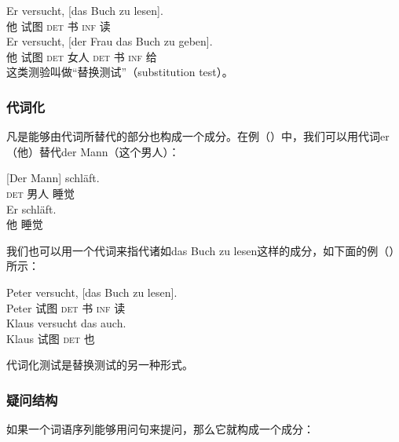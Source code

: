 \eal
\ex\label{ex-das-buch-zu-lesen} 
\gll Er versucht, [das Buch zu lesen].\\
	他 试图 \spacebr{}\textsc{det} 书 \textsc{inf} 读\\
\ex 
\gll Er versucht, [der Frau das Buch zu geben].\\
	 他 试图 \spacebr{}\textsc{det} 女人 \textsc{det} 书 \textsc{inf} 给\\
\zl
%
这类测验叫做“替换测试”（substitution test）。

\subsubsection{代词化}
凡是能够由代词所替代的部分也构成一个成分。在例（）中，我们可以用代词er（他）替代der Mann（这个男人）：

\eal
\ex 
\gll {}[Der Mann] schläft.\\
	 {}\spacebr{}\textsc{det} 男人 睡觉\\
\ex 
\gll Er schläft.\\
	 他 睡觉\\
\zl

\noindent
我们也可以用一个代词来指代诸如das Buch zu lesen这样的成分，如下面的例（）所示：

\eal
\ex 
\gll Peter versucht, [das Buch zu lesen].\\
	 Peter 试图 \spacebr{}\textsc{det} 书 \textsc{inf} 读\\
\ex 
\gll Klaus versucht das auch.\\
	 Klaus 试图 \textsc{det} 也\\
\zl

\noindent
代词化测试是替换测试的另一种形式。

\subsubsection{疑问结构}
如果一个词语序列能够用问句来提问，那么它就构成一个成分：

